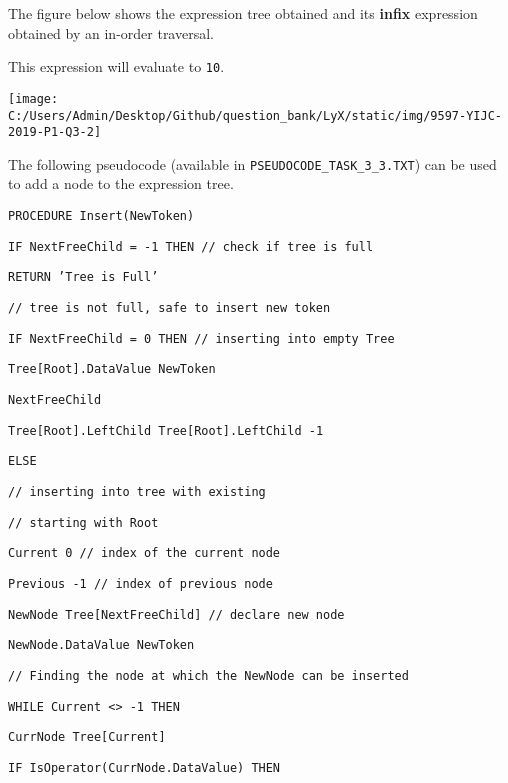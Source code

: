 The figure below shows the expression tree obtained and its \textbf{infix}
expression obtained by an in-order traversal. 

This expression will evaluate to \texttt{10}.
\begin{center}
\texttt{[image: C:/Users/Admin/Desktop/Github/question\_bank/LyX/static/img/9597-YIJC-2019-P1-Q3-2]}
\par\end{center}

The following pseudocode (available in \texttt{PSEUDOCODE\_TASK\_3\_3.TXT})
can be used to add a node to the expression tree. 

\begin{minipage}[t]{0.88\columnwidth}%
\texttt{PROCEDURE Insert(NewToken)}

\texttt{\qquad{}IF NextFreeChild = -1 THEN // check if tree is full }

\texttt{\qquad{}\qquad{}RETURN 'Tree is Full'}

\texttt{\qquad{}// tree is not full, safe to insert new token }

\texttt{\qquad{}IF NextFreeChild = 0 THEN // inserting into empty
Tree }

\texttt{\qquad{}\qquad{}Tree{[}Root{]}.DataValue NewToken }

\texttt{\qquad{}\qquad{}NextFreeChild }

\texttt{\qquad{}\qquad{}Tree{[}Root{]}.LeftChild Tree{[}Root{]}.LeftChild
-1}

\texttt{\qquad{}ELSE }

\texttt{\qquad{}\qquad{}// inserting into tree with existing }

\texttt{\qquad{}\qquad{}// starting with Root }

\texttt{\qquad{}\qquad{}Current 0 // index of the current node }

\texttt{\qquad{}\qquad{}Previous -1 // index of previous node }

\texttt{\qquad{}\qquad{}NewNode Tree{[}NextFreeChild{]} // declare
new node }

\texttt{\qquad{}\qquad{}NewNode.DataValue NewToken }

\texttt{\qquad{}\qquad{}\qquad{}// Finding the node at which the
NewNode can be inserted }

\texttt{\qquad{}\qquad{}\qquad{}WHILE Current <> -1 THEN }

\texttt{\qquad{}\qquad{}\qquad{}\qquad{}CurrNode Tree{[}Current{]} }

\texttt{\qquad{}\qquad{}\qquad{}IF IsOperator(CurrNode.DataValue)
THEN }


\end{minipage}
